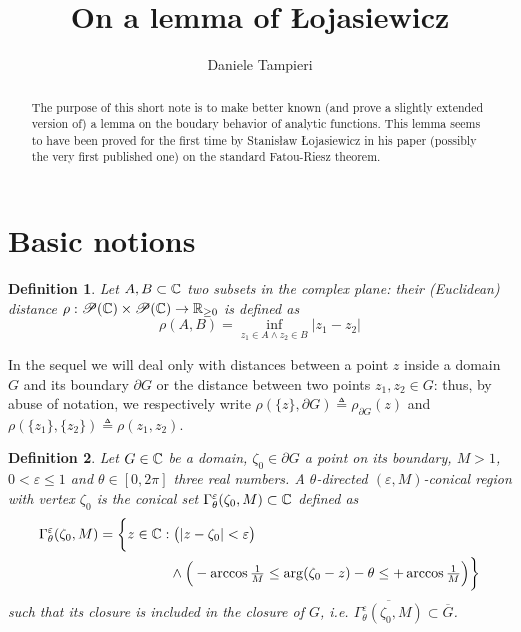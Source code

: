 \documentclass[a4paper,10pt]{article}
\title{On a lemma of Łojasiewicz}
\author{Daniele Tampieri}
\date{}
\newtheorem{defn}{Definition}
\begin{document}
\maketitle
{}
\begin{abstract}
  The purpose of this short note is to make better known (and prove a slightly extended version of) a lemma on the boudary behavior of analytic functions. This lemma seems to have been proved for the first time by Stanisław Łojasiewicz in his paper (possibly the very first published one) \cite{Lojasiewicz1950} on the standard Fatou-Riesz theorem.
\end{abstract}
\section{Basic notions}
\begin{defn} Let $A,B\subset \Bbb C$ two subsets in the complex plane: their \emph{(Euclidean) distance} $\rho:\mathscr{P}(\Bbb C)\times\mathscr{P}(\Bbb C)\to\Bbb R_{\ge0}$ is defined as
  \begin{equation*}\label{eq:dist}
    \rho(A,B)=\inf_{z_1\in A \wedge z_2\in B}|z_1-z_2|
  \end{equation*}
\end{defn}
In the sequel we will deal only with distances between a point $z$ inside a domain $G$ and its boundary $\partial G$ or the distance between two points $z_1, z_2\in G$: thus, by abuse of notation, we respectively write $\rho(\{z\},\partial G)\triangleq \rho_{\partial G}(z)$ and $\rho(\{z_1\},\{z_2\})\triangleq \rho(z_1,z_2)$.
\begin{defn}\label{def:appreg} Let $G\in\Bbb C$ be a domain, $\zeta_0 \in\partial G$ a point on its boundary, $M>1$, $0< \varepsilon \le 1$ and $\theta\in[0,2\pi]$ three real numbers. A $\theta$-\emph{directed $(\varepsilon,M)$-conical  region with vertex $\zeta_0$} is the conical set $\Gamma_{\theta}^{\varepsilon}(\zeta_0,M)\subset\Bbb C$ defined as
  \begin{equation}
    \begin{split}
      \Gamma_{\theta}^{\varepsilon}(\zeta_0,M)=\bigg\{ z\in \Bbb C  : &\; \big(|z -\zeta_0|<\varepsilon\big) \\
      & \land\Big(-\arccos\tfrac{1}{M}\le\arg (\zeta_0- z) -\theta \le + \arccos\tfrac{1}{M}\Big)\bigg\}
    \end{split}
  \end{equation}
  such that its closure is included in the closure of $G$, i.e. $\overline{\Gamma_{\theta}^{\varepsilon}(\zeta_0,M)}\subset\overline{G}$.
\end{defn}
\end{document}

